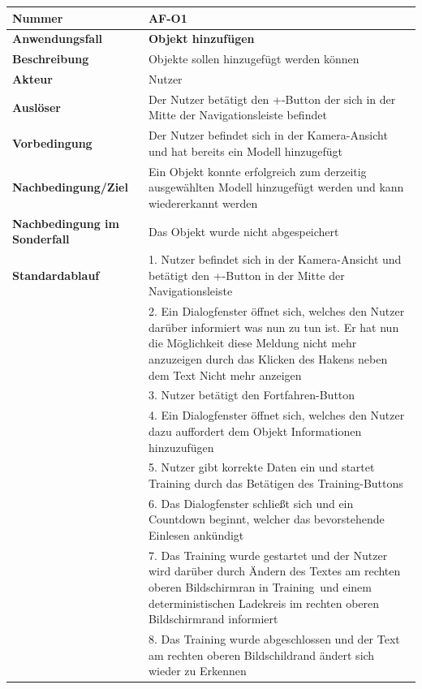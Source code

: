 \documentclass[oneside]{ausarbeitung}
\begin{document}
\begin{table}[htbp]
	\centering
	\begin{tabular}{|l|p{80mm}|}
		\hline
		\textbf{Nummer} & \textbf{AF-O1} \\ \hline
		\textbf{Anwendungsfall} & \textbf{Objekt hinzufügen} \\ \hline
		\textbf{Beschreibung} & Objekte sollen hinzugefügt werden können \\ \hline
		\textbf{Akteur} & Nutzer \\ \hline
		\textbf{Auslöser} & Der Nutzer betätigt den \glqq+\grqq-Button der sich in der Mitte der Navigationsleiste befindet  \\ \hline
		\textbf{Vorbedingung} & Der Nutzer befindet sich in der Kamera-Ansicht und hat bereits ein Modell hinzugefügt \\ \hline	
		\textbf{Nachbedingung/Ziel} & Ein Objekt konnte erfolgreich zum derzeitig ausgewählten Modell hinzugefügt werden und kann wiedererkannt werden \\ \hline
		\textbf{Nachbedingung im Sonderfall} & Das Objekt wurde nicht abgespeichert \\ \hline
		\textbf{Standardablauf} & 1. Nutzer befindet sich in der Kamera-Ansicht und betätigt den \glqq+\grqq-Button in der Mitte der Navigationsleiste \\ 
		& 2. Ein Dialogfenster öffnet sich, welches den Nutzer darüber informiert was nun zu tun ist. Er hat nun die Möglichkeit diese Meldung nicht mehr anzuzeigen durch das Klicken des Hakens neben dem Text \glqq Nicht mehr anzeigen\grqq \\
		& 3. Nutzer betätigt den \glqq Fortfahren\grqq-Button \\
		& 4. Ein Dialogfenster öffnet sich, welches den Nutzer dazu auffordert dem Objekt Informationen hinzuzufügen \\
		& 5. Nutzer gibt korrekte Daten ein und startet Training durch das Betätigen des \glqq Training\grqq-Buttons\\ 
		& 6. Das Dialogfenster schließt sich und ein Countdown beginnt, welcher das bevorstehende Einlesen ankündigt \\
		& 7. Das Training wurde gestartet und der Nutzer wird darüber durch Ändern des Textes am rechten oberen Bildschirmran in \glqq Training\grqq\ und einem deterministischen Ladekreis im rechten oberen Bildschirmrand informiert \\
		& 8. Das Training  wurde abgeschlossen und der Text am rechten oberen Bildschildrand ändert sich wieder zu \glqq Erkennen\grqq \\ \hline

\end{tabular}
\end{table}
\end{document}
